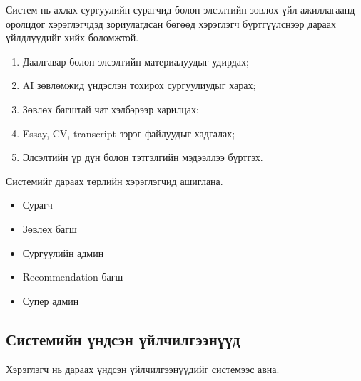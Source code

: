 Систем нь ахлах сургуулийн сурагчид болон элсэлтийн зөвлөх
үйл ажиллагаанд оролцдог хэрэглэгчдэд зориулагдсан бөгөөд
хэрэглэгч бүртгүүлснээр дараах үйлдлүүдийг хийх боломжтой.

\begin{enumerate}
    \item Даалгавар болон элсэлтийн материалуудыг удирдах;
    
    \item AI зөвлөмжид үндэслэн тохирох сургуулиудыг харах;
    
    \item Зөвлөх багштай чат хэлбэрээр харилцах;
    
    \item Essay, CV, transcript зэрэг файлуудыг хадгалах;
    
    \item Элсэлтийн үр дүн болон тэтгэлгийн мэдээллээ бүртгэх.
\end{enumerate}

Системийг дараах төрлийн хэрэглэгчид ашиглана.

\begin{itemize}
    \item Сурагч
    
    \item Зөвлөх багш
    
    \item Сургуулийн админ
    
    \item Recommendation багш
    
    \item Супер админ
\end{itemize}

\subsection*{Системийн үндсэн үйлчилгээнүүд}

Хэрэглэгч нь дараах үндсэн үйлчилгээнүүдийг системээс авна.

